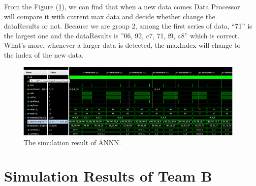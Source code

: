 \documentclass[11pt,a4paper]{report}
\begin{document}
From the Figure (\ref{TeamA PL all}), we can find that when a new data comes Data Processor will compare it with current max 
data and decide whether change the dataResults or not. Because we are group 2, among the first series of data,
 “71” is the largest one and the dataResults is ”06, 92, c7, 71, f9, a8” which is correct. What’s more, whenever
  a larger data is detected, the maxIndex will change to the index of the new data.

\begin{figure}[!ht]
    \begin{centering}
        \includegraphics[scale=0.5]{TeamA PL all.png}
        \par\end{centering}   
    \caption{The simulation result of ANNN.\label{TeamA PL all}}
\end{figure}   



\section{Simulation Results of Team B}
\label{sec:Simulation Results of Team B}


\printbibliography[title={References}]
\end{document}

